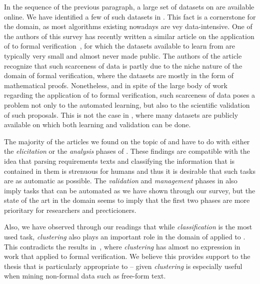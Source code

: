 In the sequence of the previous paragraph, a large set of datasets
on \RE are available online. We have identified a few of such datasets in
. This fact is a cornerstone for the domain, as most \ML
algorithms existing nowadays are vey data-intensive. One of the authors of this
survey has recently written a similar article on the application of \ML to
formal verification~\cite{AmLuBi:2018}, for which the datasets available
to learn from are typically very small and almost never made public. The authors
of the article recognize that such scarceness of data is partly due to the niche
nature of the domain of formal verification, where the datasets are mostly in
the form of mathematical proofs. Nonetheless, and in spite of the large body of
work regarding the application of \ML to formal verification, such scarceness of
data poses a problem not only to the automated learning, but also to the
scientific validation of such proposals. This is not the case in \RE, where many
datasets are publicly available on which both learning and validation can be
done.

The majority of the articles we found on the topic of \ML and \RE have to do
with either the \emph{elicitation} or the \emph{analysis} phases of \RE{}. These findings are compatible with the idea that parsing
requirements texts and classifying the information that is contained in them is
strenuous for humans and thus it is desirable that such tasks are as automatic
as possible. The \emph{validation} and \emph{management} phases in \RE also
imply tasks that can be automated as we have shown through our survey, but
the state of the art in the domain seems to imply that the first two phases are
more prioritary for researchers and precticioners.

Also, we have observed through our readings that while \emph{classification} is
the most used \ML task, \emph{clustering} also plays an important role in the
domain of \ML applied to \RE. This contradicts the results
in~\cite{AmLuBi:2018}, where \emph{clustering} has almost no expression in work
that applied \ML to formal verification. We believe this provides support to the
thesis that \ML is particularly appropriate to \RE -- given \emph{clustering} is
especially useful when mining non-formal data such as free-form text.



